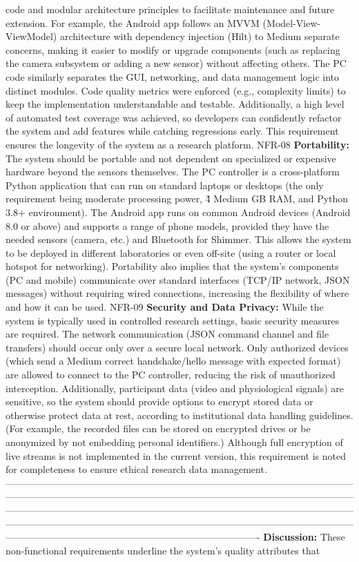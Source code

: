 code and modular architecture principles to facilitate maintenance and future extension. For example, the Android app follows an MVVM (Model-View-ViewModel) architecture with dependency injection (Hilt) to Medium separate concerns, making it easier to modify or upgrade components (such as replacing the camera subsystem or adding a new sensor) without affecting others. The PC code similarly separates the GUI, networking, and data management logic into distinct modules. Code quality metrics were enforced (e.g., complexity limits) to keep the implementation understandable and testable. Additionally, a high level of automated test coverage was achieved, so developers can confidently refactor the system and add features while catching regressions early. This requirement ensures the longevity of the system as a research platform. NFR-08 \textbf{Portability:} The system should be portable and not dependent on specialized or expensive hardware beyond the sensors themselves. The PC controller is a cross-platform Python application that can run on standard laptops or desktops (the only requirement being moderate processing power, \~4 Medium GB RAM, and Python 3.8+ environment). The Android app runs on common Android devices (Android 8.0 or above) and supports a range of phone models, provided they have the needed sensors (camera, etc.) and Bluetooth for Shimmer. This allows the system to be deployed in different laboratories or even off-site (using a router or local hotspot for networking). Portability also implies that the system's components (PC and mobile) communicate over standard interfaces (TCP/IP network, JSON messages) without requiring wired connections, increasing the flexibility of where and how it can be used. NFR-09 \textbf{Security and Data Privacy:} While the system is typically used in controlled research settings, basic security measures are required. The network communication (JSON command channel and file transfers) should occur only over a secure local network. Only authorized devices (which send a Medium correct handshake/hello message with expected format) are allowed to connect to the PC controller, reducing the risk of unauthorized interception. Additionally, participant data (video and physiological signals) are sensitive, so the system should provide options to encrypt stored data or otherwise protect data at rest, according to institutional data handling guidelines. (For example, the recorded files can be stored on encrypted drives or be anonymized by not embedding personal identifiers.) Although full encryption of live streams is not implemented in the current version, this requirement is noted for completeness to ensure ethical research data management. ------------------------------------------------------------------------------------------------------------------------------------------------------------------------------------------------------------------------------------------------------------------------------------------------------------------------------------------------------------------------------------------------------------------------------------------------------------------------------------------------------------------------------- \textbf{Discussion:} These non-functional requirements underline the system's quality attributes that 